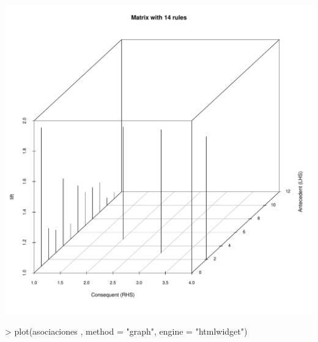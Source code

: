 \documentclass [a4paper] {article}
\begin{document}
\includegraphics{Practica2-scatter3d1}
\begin{Schunk}
\begin{Sinput}
> plot(asociaciones , method = "graph",  engine = "htmlwidget")
\end{Sinput}
\end{Schunk}
\end{document}
